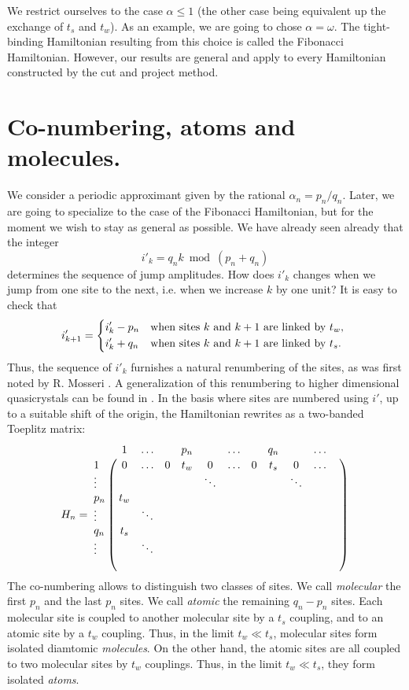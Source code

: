 \documentclass[11pt]{article}
\begin{document}
We restrict ourselves to the case $\alpha \leq 1$ (the other case being equivalent up the exchange of $t_s$ and $t_w$). As an example, we are going to chose $\alpha = \omega$. The tight-binding Hamiltonian resulting from this choice is called the Fibonacci Hamiltonian.
However, our results are general and apply to every Hamiltonian constructed by the cut and project method.

\section{Co-numbering, atoms and molecules.}

We consider a periodic approximant given by the rational $\alpha_n = p_n/q_n$. Later, we are going to specialize to the case of the Fibonacci Hamiltonian, but for the moment we wish to stay as general as possible.
We have already seen already that the integer
\begin{equation}
	i'_k = q_n k \bmod(p_n+q_n)
\end{equation}
determines the sequence of jump amplitudes. How does $i'_k$ changes when we jump from one site to the next, i.e. when we increase $k$ by one unit? It is easy to check that
\begin{equation}
	i'_{k+1} = \begin{dcases*}
	i'_k - p_n & when sites $k$ and $k+1$ are linked by $t_w$, \\
	i'_k + q_n & when sites $k$ and $k+1$ are linked by $t_s$.
	\end{dcases*}
\end{equation}
Thus, the sequence of $i'_k$ furnishes a natural renumbering of the sites, as was first noted by R. Mosseri \cite{Moss}. A generalization of this renumbering to higher dimensional quasicrystals can be found in \cite{MossSire}.
In the basis where sites are numbered using $i'$, up to a suitable shift of the origin, the Hamiltonian rewrites as a two-banded Toeplitz matrix:
\begin{equation}
	H_n = 
	\bordermatrix{ 
	 	& 1 	&	\ldots & & p_n	& &  \ldots &	& q_n &	& \ldots	&  \cr
    1 	& 0 		& \ldots & 0 & t_w & 0	& \ldots & 0 & t_s	& 0 		& \ldots		 \cr
    \vdots & & & & & \ddots	& & & & \ddots & \cr
    p_n & t_w \cr
    \vdots & & \ddots \cr
    q_n & t_s \cr
    \vdots & & \ddots \cr
     & 
    }
\end{equation}
The co-numbering allows to distinguish two classes of sites. We call \emph{molecular} the first $p_n$ and the last $p_n$ sites. We call \emph{atomic} the remaining $q_n - p_n$ sites.
Each molecular site is coupled to another molecular site by a $t_s$ coupling, and to an atomic site by a $t_w$ coupling. Thus, in the limit $t_w \ll t_s$, molecular sites form isolated diamtomic \emph{molecules}. 
On the other hand, the atomic sites are all coupled to two molecular sites by $t_w$ couplings. Thus, in the limit $t_w \ll t_s$, they form isolated \emph{atoms}.
\end{document}
